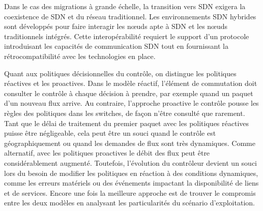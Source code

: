 Dans le cas des migrations à grande échelle, la transition vers SDN exigera la coexistence de SDN et du réseau traditionnel. Les environnements SDN hybrides sont développés pour faire interagir les nœuds apte à SDN et les nœuds traditionnels intégrés. Cette interopérabilité requiert le support d'un protocole introduisant les capacités de communication SDN tout en fournissant la rétrocompatibilité avec les technologies en place. \cite{AdoptionResearchTrendsImplementationIssues}




Quant aux politiques décisionnelles du contrôle, on distingue les politiques réactives et les proactives. Dans le modèle réactif, l'élément de commutation doit consulter le contrôle à chaque décision à prendre, par exemple quand un paquet d'un nouveau flux arrive. Au contraire, l'approche proactive le contrôle pousse les règles des politiques dans les switches, de façon n'être consulté que rarement. Tant que le délai de traitement du premier paquet avec les politiques réactives puisse être négligeable, cela peut être un souci quand le contrôle est géographiquement ou quand les demandes de flux sont très dynamiques. Comme alternatif, avec les politiques proactives le débit des flux peut être considérablement augmenté. Toutefois, l'évolution du contrôleur devient un souci lors du besoin de modifier les politiques en réaction à des conditions dynamiques, comme les erreurs matériels ou des événements impactant la disponibilité de liens et de services. Encore une fois la meilleure approche est de trouver le compromis entre les deux modèles en analysant les particularités du scénario d'exploitation. \cite{SurveySDNArchi} \cite{CiscoSDNWhyLike} 

